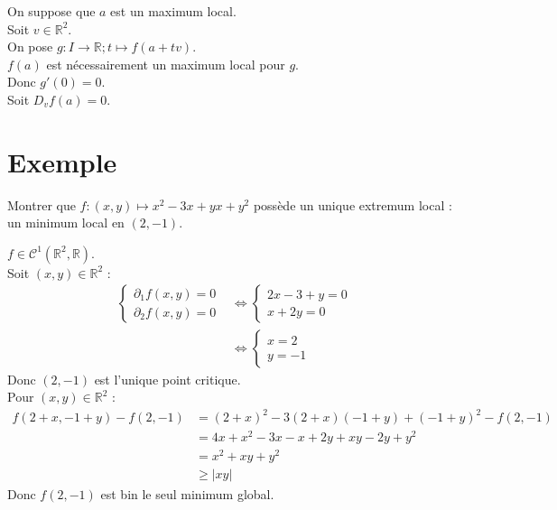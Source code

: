 \documentclass[../main.tex]{subfiles}
\begin{document}
\noindent On suppose que $a$ est un maximum local. \\
Soit $v\in \mathbb{R}^2$. \\
On pose $g:I\to \mathbb{R}; t\mapsto f(a + tv)$. \\
$f(a)$ est nécessairement un maximum local pour $g$. \\
Donc $g'(0) = 0$. \\
Soit $D_v f(a) = 0$. 

\section{Exemple}
\begin{tcolorbox}[title=Exemple 36.52, title filled=false, colframe=darkgreen, colback=darkgreen!10!white]
    Montrer que $f:(x, y) \mapsto x^2-3 x+y x+y^2$ possède un unique extremum local : un minimum local en $(2,-1)$.
\end{tcolorbox}

\noindent $f\in \mathcal{C}^1(\mathbb{R}^2, \mathbb{R})$. \\
Soit $(x, y)\in \mathbb{R}^2$ : 
\begin{align*}
    \begin{cases}
        \partial_1 f(x, y) = 0 \\
        \partial_2 f(x, y) = 0
    \end{cases} &\Leftrightarrow \begin{cases}
        2x - 3 + y = 0 \\
        x + 2y = 0
    \end{cases} \\
    &\Leftrightarrow \begin{cases}
        x = 2 \\
        y = -1
    \end{cases}
\end{align*}
Donc $(2, -1)$ est l'unique point critique. \\
Pour $(x, y)\in \mathbb{R}^2$ : 
\begin{align*}
    f(2 + x, -1 + y) - f(2, -1) &= (2 + x)^2 - 3(2 + x)(-1 + y) + (-1 + y)^2 - f(2, -1) \\
    &= 4x + x^2 - 3x - x + 2y + xy - 2y + y^2 \\
    &= x^2 + xy + y^2 \\
    &\geq |xy|
\end{align*}
Donc $f(2, -1)$ est bin le seul minimum global. 
\end{document}
